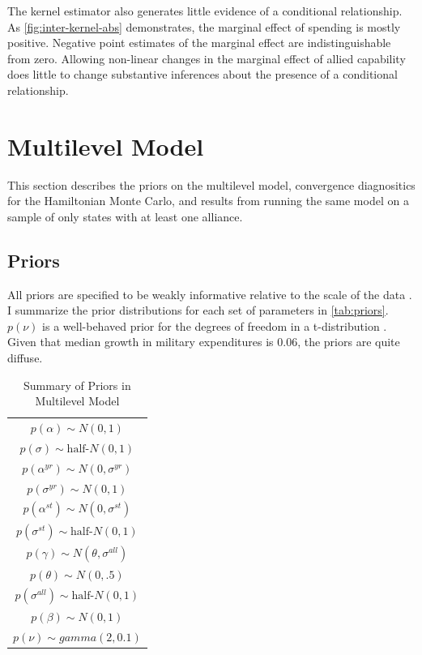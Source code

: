 \documentclass[12pt]{article}
\begin{document}
The kernel estimator also generates little evidence of a conditional relationship. 
As \autoref{fig:inter-kernel-abs} demonstrates, the marginal effect of spending is mostly positive. 
Negative point estimates of the marginal effect are indistinguishable from zero. 
Allowing non-linear changes in the marginal effect of allied capability does little to change substantive inferences about the presence of a conditional relationship. 





\section{Multilevel Model}

This section describes the priors on the multilevel model, convergence diagnositics for the Hamiltonian Monte Carlo, and results from running the same model on a sample of only states with at least one alliance. 

\subsection{Priors} 

All priors are specified to be weakly informative relative to the scale of the data \citep{Gelmanetal2017}. 
I summarize the prior distributions for each set of parameters in \autoref{tab:priors}. 
$p(\nu)$ is a well-behaved prior for the degrees of freedom in a t-distribution \citep{JuarezSteele2010}. 
Given that median growth in military expenditures is 0.06, the priors are quite diffuse. 


\begin{table} %
\begin{center}
\begin{tabular}{c} 
$ p(\alpha) \sim N(0, 1)$  \\
$ p(\sigma) \sim \mbox{half-}N(0, 1) $ \\
$ p(\alpha^{yr}) \sim N(0, \sigma^{yr}) $ \\ 
$ p(\sigma^{yr}) \sim N(0, 1) $ \\
$ p(\alpha^{st}) \sim N(0, \sigma^{st}) $ \\ 
$ p(\sigma^{st}) \sim \mbox{half-}N(0, 1) $ \\ 
$ p(\gamma) \sim N(\theta, \sigma^{all}) $ \\ 
$ p(\theta) \sim N(0, .5) $ \\
$ p(\sigma^{all}) \sim \mbox{half-}N(0, 1) $ \\
$ p(\beta) \sim N(0, 1) $ \\
$ p(\nu) \sim gamma(2, 0.1)$ 
\end{tabular} 
\caption{Summary of Priors in Multilevel Model} 
\label{tab:priors}
\end{center} 
\end{table} 
\end{document}
